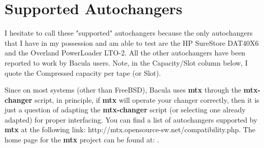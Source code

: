 
\chapter{Supported Autochangers}
\label{Models}

I hesitate to call these "supported" autochangers because the only
autochangers that I have in my possession and am able to test are the HP
SureStore DAT40X6 and the Overland PowerLoader LTO-2.  All the other
autochangers have been reported to work by Bacula users.  Note, in the
Capacity/Slot column below, I quote the Compressed capacity per tape (or
Slot).

Since on most systems (other than FreeBSD), Bacula uses {\bf mtx}
through the {\bf mtx-changer} script, in principle, if {\bf mtx}
will operate your changer correctly, then it is just a question
of adapting the {\bf mtx-changer} script (or selecting one
already adapted) for proper interfacing.  You can find a list of
autochangers supported by {\bf mtx} at the following link:
{http://mtx.opensource-sw.net/compatibility.php}.
The home page for the {\bf mtx} project can be found at:
.


